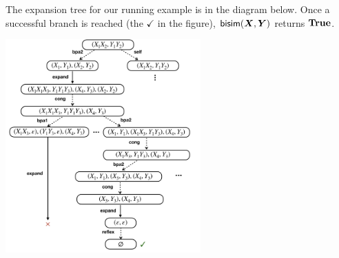 \begin{example}
  The expansion tree for our running example is in the diagram
  below. Once a successful branch is reached (the $\checkmark$ in the
  figure), $\Bisim(\vec X, \vec Y)$ returns $\mathbf{True}$.
  \begin{center}
    \includegraphics[width=7.5cm]{img/expansion_tree_example.png}
  \end{center}
\end{example}

